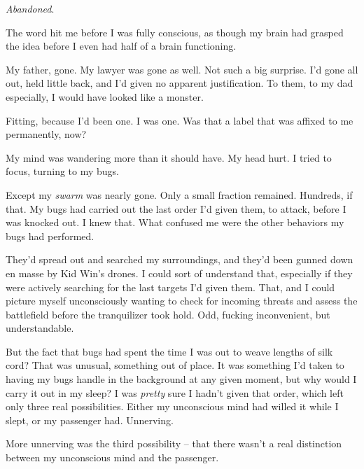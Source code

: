 





\emph{Abandoned}.



The word hit me before I was fully conscious, as though my brain had grasped the idea before I even had half of a brain functioning.



My father, gone.  My lawyer was gone as well.  Not such a big surprise.  I'd gone all out, held little back, and I'd given no apparent justification.  To them, to my dad especially, I would have looked like a monster.



Fitting, because I'd been one.  I was one.  Was that a label that was affixed to me permanently, now?



My mind was wandering more than it should have.  My head hurt.  I tried to focus, turning to my bugs.



Except my \emph{swarm} was nearly gone.  Only a small fraction remained.  Hundreds, if that.  My bugs had carried out the last order I'd given them, to attack, before I was knocked out.  I knew that.  What confused me were the other behaviors my bugs had performed.



They'd spread out and searched my surroundings, and they'd been gunned down en masse by Kid Win's drones. I could sort of understand that, especially if they were actively searching for the last targets I'd given them. That, and I could picture myself unconsciously wanting to check for incoming threats and assess the battlefield before the tranquilizer took hold.  Odd, fucking inconvenient, but understandable.



But the fact that bugs had spent the time I was out to weave lengths of silk cord?  That was unusual, something out of place.  It was something I'd taken to having my bugs handle in the background at any given moment, but why would I carry it out in my sleep?  I was \emph{pretty} sure I hadn't given that order, which left only three real possibilities.  Either my unconscious mind had willed it while I slept, or my passenger had.  Unnerving.



More unnerving was the third possibility – that there wasn't a real distinction between my unconscious mind and the passenger.



